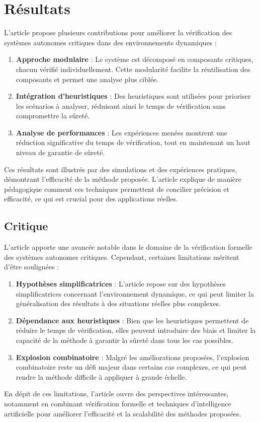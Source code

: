 \documentclass[../CSC_5RO10_TA.tex]{subfiles}
\begin{document}
\section{Résultats}
\noindent L'article propose plusieurs contributions pour améliorer la vérification des systèmes autonomes critiques dans des environnements dynamiques :
\begin{enumerate}[rightmargin=\leftmargin]
    \item \textbf{Approche modulaire} : Le système est décomposé en composants critiques, chacun vérifié individuellement. Cette modularité facilite la réutilisation des composants et permet une analyse plus ciblée.
    \item \textbf{Intégration d'heuristiques} : Des heuristiques sont utilisées pour prioriser les scénarios à analyser, réduisant ainsi le temps de vérification sans compromettre la sûreté.
    \item \textbf{Analyse de performances} : Les expériences menées montrent une réduction significative du temps de vérification, tout en maintenant un haut niveau de garantie de sûreté.
\end{enumerate}
\noindent Ces résultats sont illustrés par des simulations et des expériences pratiques, démontrant l'efficacité de la méthode proposée. L'article explique de manière pédagogique comment ces techniques permettent de concilier précision et efficacité, ce qui est crucial pour des applications réelles.

\subsection{Critique}
\noindent L'article apporte une avancée notable dans le domaine de la vérification formelle des systèmes autonomes critiques. Cependant, certaines limitations méritent d'être soulignées :
\begin{enumerate}[rightmargin=\leftmargin]
    \item \textbf{Hypothèses simplificatrices} : L'article repose sur des hypothèses simplificatrices concernant l'environnement dynamique, ce qui peut limiter la généralisation des résultats à des situations réelles plus complexes.
    \item \textbf{Dépendance aux heuristiques} : Bien que les heuristiques permettent de réduire le temps de vérification, elles peuvent introduire des biais et limiter la capacité de la méthode à garantir la sûreté dans tous les cas possibles.
    \item \textbf{Explosion combinatoire} : Malgré les améliorations proposées, l'explosion combinatoire reste un défi majeur dans certains cas complexes, ce qui peut rendre la méthode difficile à appliquer à grande échelle.
\end{enumerate}
\noindent En dépit de ces limitations, l'article ouvre des perspectives intéressantes, notamment en combinant vérification formelle et techniques d'intelligence artificielle pour améliorer l'efficacité et la scalabilité des méthodes proposées.
\end{document}

